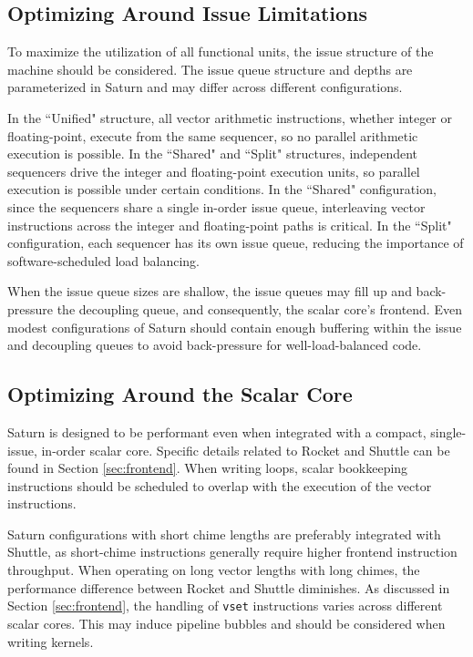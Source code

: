 \subsection{Optimizing Around Issue Limitations}

To maximize the utilization of all functional units, the issue structure of the machine should be considered.
The issue queue structure and depths are parameterized in Saturn and may differ across different configurations.

In the ``Unified" structure, all vector arithmetic instructions, whether integer or floating-point, execute from the same sequencer, so no parallel arithmetic execution is possible.
In the ``Shared" and ``Split" structures, independent sequencers drive the integer and floating-point execution units, so parallel execution is possible under certain conditions.
In the ``Shared" configuration, since the sequencers share a single in-order issue queue, interleaving vector instructions across the integer and floating-point paths is critical.
In the ``Split" configuration, each sequencer has its own issue queue, reducing the importance of software-scheduled load balancing.

When the issue queue sizes are shallow, the issue queues may fill up and back-pressure the decoupling queue, and consequently, the scalar core's frontend.
Even modest configurations of Saturn should contain enough buffering within the issue and decoupling queues to avoid back-pressure for well-load-balanced code.


\subsection{Optimizing Around the Scalar Core}

Saturn is designed to be performant even when integrated with a compact, single-issue, in-order scalar core.
Specific details related to Rocket and Shuttle can be found in Section \ref{sec:frontend}.
When writing loops, scalar bookkeeping instructions should be scheduled to overlap with the execution of the vector instructions.

Saturn configurations with short chime lengths are preferably integrated with Shuttle, as short-chime instructions generally require higher frontend instruction throughput.
When operating on long vector lengths with long chimes, the performance difference between Rocket and Shuttle diminishes.
As discussed in Section \ref{sec:frontend}, the handling of \texttt{vset} instructions varies across different scalar cores.
This may induce pipeline bubbles and should be considered when writing kernels.  


